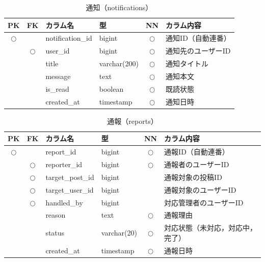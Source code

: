 \begin{table}[H]
    \centering
    \caption{通知（notifications）}
    \label{tab:db_notifications}
    \small
    \begin{tabularx}{\textwidth}{|c|c|l|l|c|X|}
        \hline
        PK & FK & カラム名 & 型 & NN & カラム内容 \\ \hline
        $\bigcirc$ & & notification\_id & bigint & $\bigcirc$ & 通知ID（自動連番） \\ \hline
        & $\bigcirc$ & user\_id & bigint & $\bigcirc$ & 通知先のユーザーID \\ \hline
        & & title & varchar(200) & $\bigcirc$ & 通知タイトル \\ \hline
        & & message & text & $\bigcirc$ & 通知本文 \\ \hline
        & & is\_read & boolean & $\bigcirc$ & 既読状態 \\ \hline
        & & created\_at & timestamp & $\bigcirc$ & 通知日時 \\ \hline
    \end{tabularx}
\end{table}



\begin{table}[H]
    \centering
    \caption{通報（reports）}
    \label{tab:db_reports}
    \small
    \begin{tabularx}{\textwidth}{|c|c|l|l|c|X|}
        \hline
        PK & FK & カラム名 & 型 & NN & カラム内容 \\ \hline
        $\bigcirc$ & & report\_id & bigint & $\bigcirc$ & 通報ID（自動連番） \\ \hline
        & $\bigcirc$ & reporter\_id & bigint & $\bigcirc$ & 通報者のユーザーID \\ \hline
        & $\bigcirc$ & target\_post\_id & bigint & & 通報対象の投稿ID \\ \hline
        & $\bigcirc$ & target\_user\_id & bigint & & 通報対象のユーザーID \\ \hline
        & $\bigcirc$ & handled\_by & bigint & & 対応管理者のユーザーID \\ \hline
        & & reason & text & $\bigcirc$ & 通報理由 \\ \hline
        & & status & varchar(20) & $\bigcirc$ & 対応状態（未対応，対応中，完了） \\ \hline
        & & created\_at & timestamp & $\bigcirc$ & 通報日時 \\ \hline
    \end{tabularx}
\end{table}


